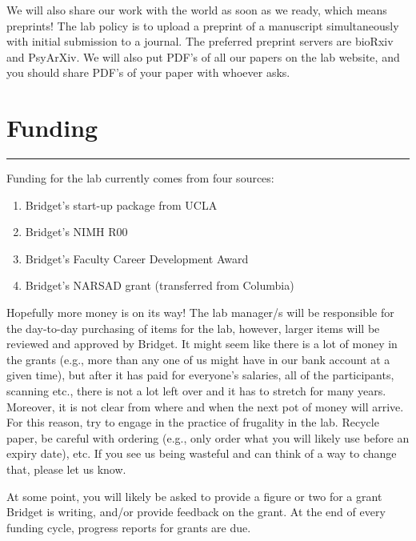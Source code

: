 \documentclass[
]{book}
\providecommand{\tightlist}{%
  \setlength{\itemsep}{0pt}\setlength{\parskip}{0pt}}
\begin{document}
We will also share our work with the world as soon as we ready, which means preprints! The lab policy is to upload a preprint of a manuscript simultaneously with initial submission to a journal. The preferred preprint servers are bioRxiv and PsyArXiv. We will also put PDF's of all our papers on the lab website, and you should share PDF's of your paper with whoever asks.

\hypertarget{funding}{%
\chapter{Funding}\label{funding}}

\begin{center}\rule{0.5\linewidth}{0.5pt}\end{center}

Funding for the lab currently comes from four sources:

\begin{enumerate}
\def\labelenumi{\arabic{enumi}.}
\tightlist
\item
  Bridget's start-up package from UCLA
\item
  Bridget's NIMH R00
\item
  Bridget's Faculty Career Development Award
\item
  Bridget's NARSAD grant (transferred from Columbia)
\end{enumerate}

Hopefully more money is on its way! The lab manager/s will be responsible for the day-to-day purchasing of items for the lab, however, larger items will be reviewed and approved by Bridget. It might seem like there is a lot of money in the grants (e.g., more than any one of us might have in our bank account at a given time), but after it has paid for everyone's salaries, all of the participants, scanning etc., there is not a lot left over and it has to stretch for many years. Moreover, it is not clear from where and when the next pot of money will arrive. For this reason, try to engage in the practice of frugality in the lab. Recycle paper, be careful with ordering (e.g., only order what you will likely use before an expiry date), etc. If you see us being wasteful and can think of a way to change that, please let us know.

At some point, you will likely be asked to provide a figure or two for a grant Bridget is writing, and/or provide feedback on the grant. At the end of every funding cycle, progress reports for grants are due.
\end{document}
